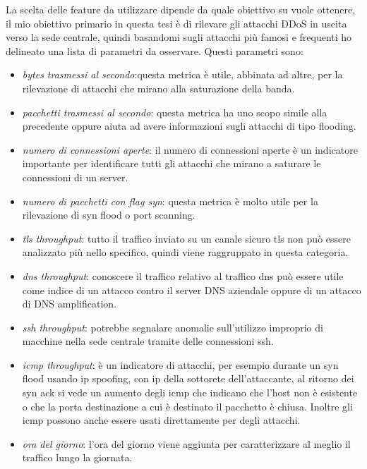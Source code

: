 La scelta delle feature da utilizzare dipende da quale obiettivo su vuole ottenere, il mio obiettivo primario in questa tesi è di rilevare gli attacchi DDoS in uscita verso la sede centrale, quindi basandomi sugli attacchi più famosi e frequenti ho delineato una lista di parametri da osservare. Questi parametri sono:
\begin{itemize}
    \item \emph{bytes trasmessi al secondo}:questa metrica è utile, abbinata ad altre, per la rilevazione di attacchi che mirano alla saturazione della banda.
    \item \emph{pacchetti trasmessi al secondo}: questa metrica ha uno scopo simile alla precedente oppure aiuta ad avere informazioni sugli attacchi di tipo flooding.
    \item \emph{numero di connessioni aperte}: il numero di connessioni aperte è un indicatore importante per identificare tutti gli attacchi che mirano a saturare le connessioni di un server. %
    \item \emph{numero di pacchetti con flag syn}: questa metrica è molto utile per la rilevazione di syn flood o port scanning.
    \item \emph{tls throughput}: tutto il traffico inviato su un canale sicuro tls non può essere analizzato più nello specifico, quindi viene raggruppato in questa categoria.
    \item \emph{dns throughput}: conoscere il traffico relativo al traffico dns può essere utile come indice di un attacco contro il server DNS aziendale oppure di un attacco di DNS amplification.
    \item \emph{ssh throughput}: potrebbe segnalare anomalie sull'utilizzo improprio di macchine nella sede centrale tramite delle connessioni ssh.
    \item \emph{icmp throughput}: è un indicatore di attacchi, per esempio durante un syn flood usando ip spoofing, con ip della sottorete dell'attaccante, al ritorno dei syn ack si vede un aumento degli icmp che indicano che l'host non è esistente o che la porta destinazione a cui è destinato il pacchetto è chiusa. Inoltre gli icmp possono anche essere usati direttamente per degli attacchi.
    \item \emph{ora del giorno}: l'ora del giorno viene aggiunta per caratterizzare al meglio il traffico lungo la giornata.
\end{itemize}

